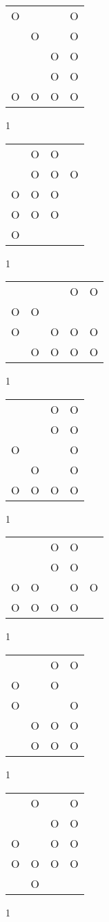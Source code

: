 \begin{tabular}{|m{0.2cm}m{0.2cm}m{0.2cm}m{0.2cm}|}\hline
O& & &O\\
 &O& &O\\
 & &O&O\\
 & &O&O\\
O&O&O&O\\
\hline\end{tabular}1
\begin{tabular}{|m{0.2cm}m{0.2cm}m{0.2cm}m{0.2cm}|}\hline
 &O&O& \\
 &O&O&O\\
O&O&O& \\
O&O&O& \\
O& & & \\
\hline\end{tabular}1
\begin{tabular}{|m{0.2cm}m{0.2cm}m{0.2cm}m{0.2cm}m{0.2cm}|}\hline
 & & &O&O\\
O&O& & & \\
O& &O&O&O\\
 &O&O&O&O\\
\hline\end{tabular}1
\begin{tabular}{|m{0.2cm}m{0.2cm}m{0.2cm}m{0.2cm}|}\hline
 & &O&O\\
 & &O&O\\
O& & &O\\
 &O& &O\\
O&O&O&O\\
\hline\end{tabular}1
\begin{tabular}{|m{0.2cm}m{0.2cm}m{0.2cm}m{0.2cm}m{0.2cm}|}\hline
 & &O&O& \\
 & &O&O& \\
O&O& &O&O\\
O&O&O&O& \\
\hline\end{tabular}1
\begin{tabular}{|m{0.2cm}m{0.2cm}m{0.2cm}m{0.2cm}|}\hline
 & &O&O\\
O& &O& \\
O& & &O\\
 &O&O&O\\
 &O&O&O\\
\hline\end{tabular}1
\begin{tabular}{|m{0.2cm}m{0.2cm}m{0.2cm}m{0.2cm}|}\hline
 &O& &O\\
 & &O&O\\
O& &O&O\\
O&O&O&O\\
 &O& & \\
\hline\end{tabular}1
